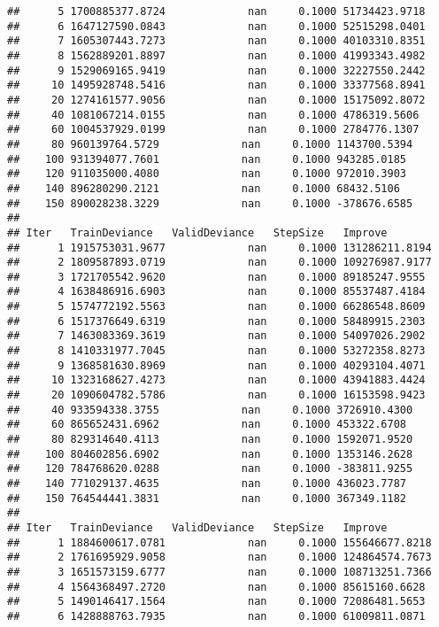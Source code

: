 \documentclass[
]{article}
\begin{document}
\begin{verbatim}
##      5 1700885377.8724             nan     0.1000 51734423.9718
##      6 1647127590.0843             nan     0.1000 52515298.0401
##      7 1605307443.7273             nan     0.1000 40103310.8351
##      8 1562889201.8897             nan     0.1000 41993343.4982
##      9 1529069165.9419             nan     0.1000 32227550.2442
##     10 1495928748.5416             nan     0.1000 33377568.8941
##     20 1274161577.9056             nan     0.1000 15175092.8072
##     40 1081067214.0155             nan     0.1000 4786319.5606
##     60 1004537929.0199             nan     0.1000 2784776.1307
##     80 960139764.5729             nan     0.1000 1143700.5394
##    100 931394077.7601             nan     0.1000 943285.0185
##    120 911035000.4080             nan     0.1000 972010.3903
##    140 896280290.2121             nan     0.1000 68432.5106
##    150 890028238.3229             nan     0.1000 -378676.6585
## 
## Iter   TrainDeviance   ValidDeviance   StepSize   Improve
##      1 1915753031.9677             nan     0.1000 131286211.8194
##      2 1809587893.0719             nan     0.1000 109276987.9177
##      3 1721705542.9620             nan     0.1000 89185247.9555
##      4 1638486916.6903             nan     0.1000 85537487.4184
##      5 1574772192.5563             nan     0.1000 66286548.8609
##      6 1517376649.6319             nan     0.1000 58489915.2303
##      7 1463083369.3619             nan     0.1000 54097026.2902
##      8 1410331977.7045             nan     0.1000 53272358.8273
##      9 1368581630.8969             nan     0.1000 40293104.4071
##     10 1323168627.4273             nan     0.1000 43941883.4424
##     20 1090604782.5786             nan     0.1000 16153598.9423
##     40 933594338.3755             nan     0.1000 3726910.4300
##     60 865652431.6962             nan     0.1000 453322.6708
##     80 829314640.4113             nan     0.1000 1592071.9520
##    100 804602856.6902             nan     0.1000 1353146.2628
##    120 784768620.0288             nan     0.1000 -383811.9255
##    140 771029137.4635             nan     0.1000 436023.7787
##    150 764544441.3831             nan     0.1000 367349.1182
## 
## Iter   TrainDeviance   ValidDeviance   StepSize   Improve
##      1 1884600617.0781             nan     0.1000 155646677.8218
##      2 1761695929.9058             nan     0.1000 124864574.7673
##      3 1651573159.6777             nan     0.1000 108713251.7366
##      4 1564368497.2720             nan     0.1000 85615160.6628
##      5 1490146417.1564             nan     0.1000 72086481.5653
##      6 1428888763.7935             nan     0.1000 61009811.0871

\end{verbatim}
\end{document}
